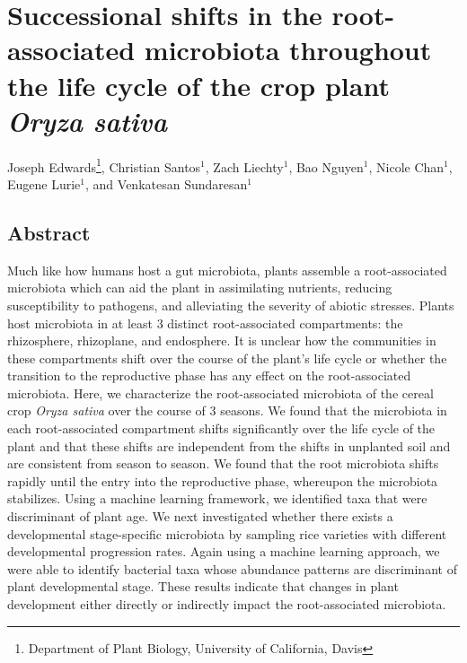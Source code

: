 \chapter{Successional shifts in the root-associated microbiota throughout the life cycle of the crop plant \textit{Oryza sativa}}

Joseph Edwards\footnote[1]{Department of Plant Biology, University of California, Davis}, Christian Santos$^1$, Zach Liechty$^1$, Bao Nguyen$^1$, Nicole Chan$^1$, Eugene Lurie$^1$, and Venkatesan Sundaresan$^1$

\section{Abstract}
Much like how humans host a gut microbiota, plants assemble a root-associated microbiota which can aid the plant in assimilating nutrients, reducing susceptibility to pathogens, and alleviating the severity of abiotic stresses. Plants host microbiota in at least 3 distinct root-associated compartments: the rhizosphere, rhizoplane, and endosphere. It is unclear how the communities in these compartments shift over the course of the plant's life cycle or whether the transition to the reproductive phase has any effect on the root-associated microbiota. Here, we characterize the root-associated microbiota of the cereal crop \textit{Oryza sativa} over the course of 3 seasons. We found that the microbiota in each root-associated compartment shifts significantly over the life cycle of the plant and that these shifts are independent from the shifts in unplanted soil and are consistent from season to season. We found that the root microbiota shifts rapidly until the entry into the reproductive phase, whereupon the microbiota stabilizes. Using a machine learning framework, we identified taxa that were discriminant of plant age. We next investigated whether there exists a developmental stage-specific microbiota by sampling rice varieties with different developmental progression rates. Again using a machine learning approach, we were able to identify bacterial taxa whose abundance patterns are discriminant of plant developmental stage. These results indicate that changes in plant development either directly or indirectly impact the root-associated microbiota.

